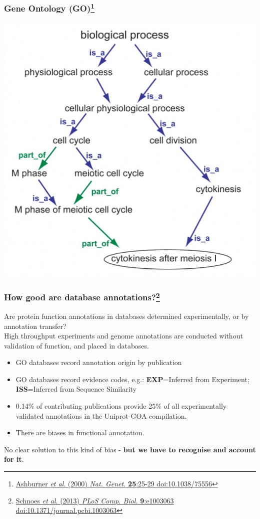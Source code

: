 \begin{frame}
  \frametitle{Gene Ontology (GO)\footnote{\tiny{\href{http://dx.doi.org/10.1038/75556}{Ashburner \textit{et al}. (2000) \textit{Nat. Genet.} \textbf{25}:25-29 doi:10.1038/75556}}}}
  \begin{center}
    \includegraphics[height=0.7\textheight]{images/go_example}
  \end{center}
\end{frame}

\begin{frame}
  \frametitle{How good are database annotations?\footnote{\tiny{\href{http://dx.doi.org/10.1371/journal.pcbi.1003063}{Schnoes \textit{et al}. (2013) \textit{PLoS Comp. Biol.} \textbf{9}:e1003063 doi:10.1371/journal.pcbi.1003063}}}}
  Are protein function annotations in databases determined experimentally, or by annotation transfer?\\[0.1cm]
  High throughput experiments and genome annotations are conducted without validation of function, and placed in databases.\\[0.1cm]
  \begin{itemize}
    \item GO databases record annotation origin by publication 
    \item GO databases record evidence codes, e.g.: \textbf{EXP}=Inferred from Experiment; \textbf{ISS}=Inferred from Sequence Similarity
    \item 0.14\% of contributing publications provide 25\% of all experimentally validated annotations in the Uniprot-GOA compilation.
    \item There are biases in functional annotation.
  \end{itemize}
  No clear solution to this kind of bias - \textbf{but we have to recognise and account for it}.
\end{frame}

